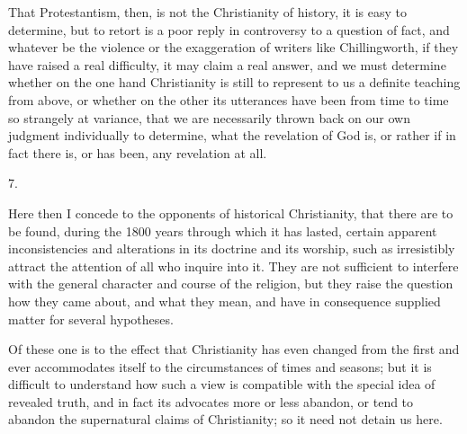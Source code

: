 That Protestantism, then, is not the Christianity of
history, it is easy to determine, but to retort is a poor
reply in controversy to a question of fact, and whatever
be the violence or the exaggeration of writers like
Chillingworth, if they have raised a real difficulty, it
may claim a real answer, and we must determine whether on
the one hand Christianity is still to represent to us a
definite teaching from above, or whether on the other its
utterances have been from time to time so strangely at
variance, that we are necessarily thrown back on our own
judgment individually to determine, what the revelation
of God is, or rather if in fact there is, or has been,
any revelation at all.

7.

Here then I concede to the opponents of historical
Christianity, that there are to be found, during the 1800
years through which it has lasted, certain apparent
inconsistencies and alterations in its doctrine and its
worship, such as irresistibly attract the attention of
all who inquire into it. They are not sufficient to
interfere with the general character and course of the
religion, but they raise the question how they came
about, and what they mean, and have in consequence
supplied matter for several hypotheses.

Of these one is to the effect that Christianity has
even changed from the first and ever accommodates itself
to the circumstances of times and seasons; but it is
difficult to understand how such a view is compatible
with the special idea of revealed truth, and in fact its
advocates more or less abandon, or tend to abandon the
supernatural claims of Christianity; so it need not
detain us here.

